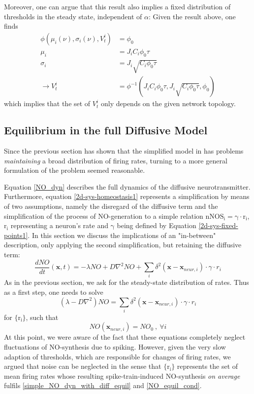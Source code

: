 \documentclass[10pt,a4paper]{article}
\begin{document}
Moreover, one can argue that this result also implies a fixed distribution of thresholds in the steady state, independent of $\alpha$: Given the result above, one finds
\begin{align}
\phi(\mu_i(\nu),\sigma_i(\nu),V_t^i) &= \phi_0 \label{fixed_thresh_dist_argument1} \\
\mu_i &= J_iC_i \phi_0 \tau \label{fixed_thresh_dist_argument2} \\
\sigma_i &= J_i\sqrt{C_i \phi_0  \tau} \label{fixed_thresh_dist_argument3} \\
\rightarrow V_t^i &= {\phi}^{-1}(J_iC_i \phi_0 \tau,J_i\sqrt{C_i \phi_0  \tau},\phi_0) \label{fixed_thresh_dist_argument4}
\end{align}
which implies that the set of $V_t^i$ only depends on the given network topology.

\subsection{Equilibrium in the full Diffusive Model}
Since the previous section has shown that the simplified model in \cite{Sweeney_Paper} has problems \emph{maintaining} a broad distribution of firing rates, turning to a more general formulation of the problem seemed reasonable.

Equation \eqref{NO_dyn} describes the full dynamics of the diffusive neurotransmitter. Furthermore, equation \eqref{2d-sys-homeostasis1} represents a simplification by means of two assumptions, namely the disregard of the diffusive term and the simplification of the process of NO-generation to a simple relation $\mathrm{nNOS_i = \gamma \cdot r_i}$, $\mathrm{r_i}$ representing a neuron's rate and $\mathrm{\gamma}$ being defined by Equation \eqref{2d-sys-fixed-points1}. In this section we discuss the implications of an "in-between" description, only applying the second simplification, but retaining the diffusive term:
\begin{equation}
\frac{dNO}{dt}(\mathbf{x},t) =-\lambda NO + D \nabla^2 NO + \sum_{i} \delta^2(\mathbf{x}-\mathbf{x}_{neur,i})\cdot \gamma \cdot r_i
\label{simple_NO_dyn_with_diff}
\end{equation}
As in the previous section, we ask for the steady-state distribution of rates. Thus as a first step, one needs to solve
\begin{equation}
(\lambda - D \nabla^2) NO = \sum_{i} \delta^2(\mathbf{x}-\mathbf{x}_{neur,i})\cdot \gamma \cdot r_i
\label{simple_NO_dyn_with_diff_equil}
\end{equation}
for $\mathrm{\lbrace r_i\rbrace}$, such that
\begin{equation}
NO(\mathbf{x}_{neur,i}) = NO_0 \:, \: \forall i
\label{NO_equil_cond}
\end{equation}
At this point, we were aware of the fact that these equations completely neglect fluctuations of NO-synthesis due to spiking. However, given the very slow adaption of thresholds, which are responsible for changes of firing rates, we argued that noise can be neglected in the sense that $\mathrm{\lbrace r_i\rbrace}$ represents the set of mean firing rates whose resulting spike-train-induced NO-synthesis \emph{on average} fulfils \eqref{simple_NO_dyn_with_diff_equil} and \eqref{NO_equil_cond}.
  
\end{document}
